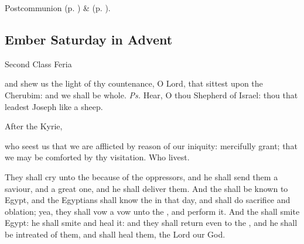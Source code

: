 \begin{rubric}
     Postcommunion  (p. \pageref{AdventIPostcommunion}) \&   (p. \pageref{SPMaryInAdvent}).
\end{rubric}


\clearpage
\subsection{Ember Saturday in Advent}
\begin{inhead}
{Second Class Feria}
\end{inhead}


\introit
{} and shew us the light of thy countenance, O Lord, that sittest upon the Cherubim: and we shall be whole. \textit{Ps.} Hear, O thou Shepherd of Israel: thou that leadest Joseph like a sheep.
\begin{rubric}
    After the Kyrie,
\end{rubric}

\collect
{} who seest us that we are afflicted by reason of our iniquity: mercifully grant; that we may be comforted by thy visitation. Who livest.


 They shall cry unto the  because of the oppressors, and he shall send them a saviour, and a great one, and he shall deliver them. And the  shall be known to Egypt, and the Egyptians shall know the  in that day, and shall do sacrifice and oblation; yea, they shall vow a vow unto the , and perform it. And the  shall smite Egypt: he shall smite and heal it: and they shall return even to the , and he shall be intreated of them, and shall heal them, the Lord our God.

\\



